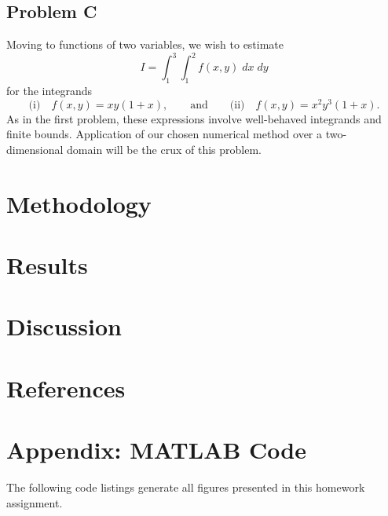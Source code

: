 \documentclass[11pt]{article}
\begin{document}
\subsection{Problem C}

Moving to functions of two variables, we wish to estimate
\begin{equation}
I = \int_1^3 \int_1^2 f(x,y) \; dx \; dy
\end{equation}
for the integrands
\begin{equation}
\text{(i)} \quad
f(x,y) = x y (1+x)
,
\qquad
\text{and}
\qquad
\text{(ii)} \quad
f(x,y) = x^2 y^3 (1+x)
.
\end{equation}
As in the first problem, these expressions involve well-behaved integrands and finite bounds. Application of our chosen numerical method over a two-dimensional domain will be the crux of this problem.

\section{Methodology}



\section{Results}

\section{Discussion}

\section{References}

\section*{Appendix: MATLAB Code}
The following code listings generate all figures presented in this homework assignment.





\end{document}
